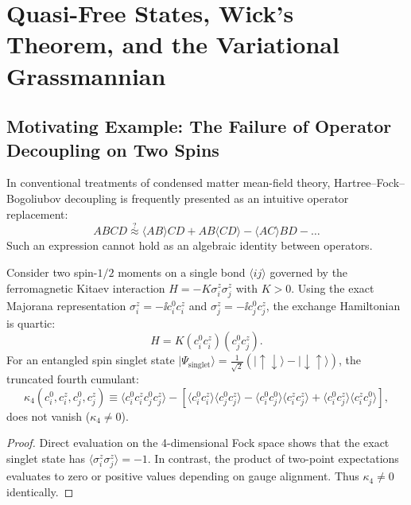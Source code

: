 \chapter{Quasi-Free States, Wick's Theorem, and the Variational Grassmannian}
\label{ch:m1_1b}

\section{Motivating Example: The Failure of Operator Decoupling on Two Spins}
\label{sec:m1_1b_motivating_example}
In conventional treatments of condensed matter mean-field theory, Hartree--Fock--Bogoliubov decoupling is frequently presented as an intuitive operator replacement:
\begin{equation}
\label{eq:m1_1b_naive_decoupling}
A B C D \stackrel{?}{\approx} \langle A B \rangle C D + A B \langle C D \rangle - \langle A C \rangle B D - \dots
\end{equation}
Such an expression cannot hold as an algebraic identity between operators.

\begin{proposition}
\label{prop:m1_1b_wick_failure}
Consider two spin-$1/2$ moments on a single bond $\langle ij \rangle$ governed by the ferromagnetic Kitaev interaction $H = -K \sigma_i^z \sigma_j^z$ with $K > 0$. Using the exact Majorana representation $\sigma_i^z = -\ii c_i^0 c_i^z$ and $\sigma_j^z = -\ii c_j^0 c_j^z$, the exchange Hamiltonian is quartic:
\begin{equation}
\label{eq:m1_1b_two_spin_quartic}
H = K (c_i^0 c_i^z)(c_j^0 c_j^z).
\end{equation}
For an entangled spin singlet state $|\Psi_{\mathrm{singlet}}\rangle = \frac{1}{\sqrt{2}}(|\!\uparrow\downarrow\rangle - |\!\downarrow\uparrow\rangle)$, the truncated fourth cumulant:
\begin{equation}
\label{eq:m1_1b_fourth_cumulant}
\kappa_4(c_i^0, c_i^z, c_j^0, c_j^z) \equiv \langle c_i^0 c_i^z c_j^0 c_j^z \rangle - \left[ \langle c_i^0 c_i^z \rangle \langle c_j^0 c_j^z \rangle - \langle c_i^0 c_j^0 \rangle \langle c_i^z c_j^z \rangle + \langle c_i^0 c_j^z \rangle \langle c_i^z c_j^0 \rangle \right],
\end{equation}
does not vanish ($\kappa_4 \neq 0$).
\end{proposition}
\begin{proof}
Direct evaluation on the 4-dimensional Fock space shows that the exact singlet state has $\langle \sigma_i^z \sigma_j^z \rangle = -1$. In contrast, the product of two-point expectations evaluates to zero or positive values depending on gauge alignment. Thus $\kappa_4 \ne 0$ identically.
\end{proof}


